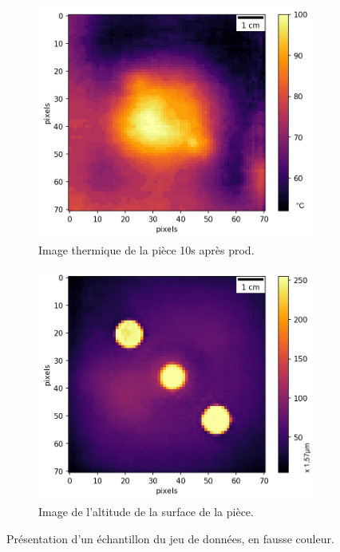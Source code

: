\begin{figure}[tbhp]
	\centering
	\begin{subfigure}[c]{0.48\textwidth}
		\includegraphics[width=\textwidth]{../Chap2/Figures/163-37_real_A.jpg}
		\caption{Image thermique de la pièce 10s après prod.}
	\end{subfigure}
	\begin{subfigure}[c]{0.48\textwidth}
		\includegraphics[width=\textwidth]{../Chap2/Figures/163-37_real_B.jpg}
		\caption{Image de l'altitude de la surface de la pièce.}
	\end{subfigure}
	\caption{Présentation d'un échantillon du jeu de données, en fausse couleur.}
	\label{fig:gan_dataset}
\end{figure}

